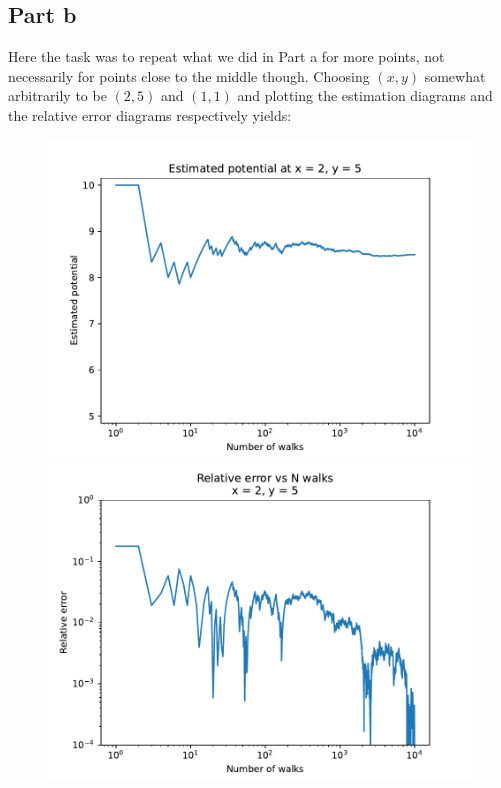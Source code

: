 \documentclass[a4paper,12pt]{article}
\begin{document}
\subsection*{Part b}

Here the task was to repeat what we did in Part a for more points, not necessarily for points close to the middle
though. Choosing $(x, y)$ somewhat arbitrarily to be $(2, 5)$ and $(1, 1)$ and plotting the estimation diagrams and
the relative error diagrams respectively yields:

\begin{figure}[!ht]
  \centering
  \begin{minipage}{0.49\textwidth}
    \includegraphics[width=\textwidth]{img/4_3b_1_V25.pdf}
  \end{minipage}
  \begin{minipage}{0.49\textwidth}
    \includegraphics[width=\textwidth]{img/4_3b_1_E25.pdf}
  \end{minipage}
\end{figure}
\end{document}
